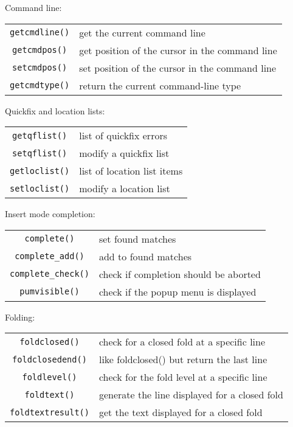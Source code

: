 Command line:
\label{command-line-functions}
\begin{center} \begin{tabular}{c l}
				\verb!getcmdline()! & get the current command line \\
				\verb!getcmdpos()! & get position of the cursor in the command line \\
				\verb!setcmdpos()! & set position of the cursor in the command line \\
				\verb!getcmdtype()! & return the current command-line type \\
\end{tabular} \end{center}

Quickfix and location lists:
\label{quickfix-functions}
\begin{center} \begin{tabular}{c l}
				\verb!getqflist()! & list of quickfix errors \\
				\verb!setqflist()! & modify a quickfix list \\
				\verb!getloclist()! & list of location list items \\
				\verb!setloclist()! & modify a location list \\
\end{tabular} \end{center}

Insert mode completion:
\label{completion-functions}
\begin{center} \begin{tabular}{c l}
				\verb!complete()! & set found matches \\
				\verb!complete_add()! & add to found matches \\
				\verb!complete_check()! & check if completion should be aborted \\
				\verb!pumvisible()! & check if the popup menu is displayed \\
\end{tabular} \end{center}

Folding:
\label{folding-functions}
\begin{center} \begin{tabular}{c l}
				\verb!foldclosed()! & check for a closed fold at a specific line \\
				\verb!foldclosedend()! & like foldclosed() but return the last line \\
				\verb!foldlevel()! & check for the fold level at a specific line \\
				\verb!foldtext()! & generate the line displayed for a closed fold \\
				\verb!foldtextresult()! & get the text displayed for a closed fold \\
\end{tabular} \end{center}

